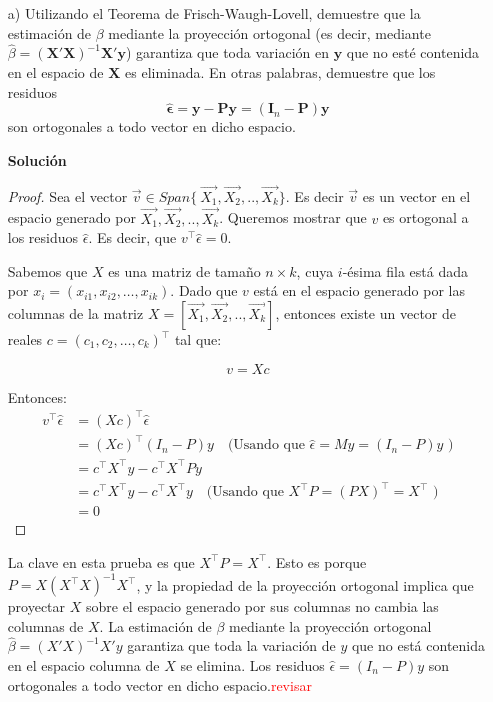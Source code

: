 \documentclass[a4paper, answers, addpoints, 11pt]{exam}
\newenvironment{solucion}{%
  \begin{mdframed}[
    backgroundcolor=blue!5,    %
    linecolor=blue!50,          %
    linewidth=2pt,              %
    leftmargin=10pt,            %
    rightmargin=10pt,           %
    topline=true,              %
    bottomline=true,            %
    roundcorner=10pt,           %
    innerleftmargin=10pt,       %
    innerrightmargin=10pt,      %
    innerbottommargin=10pt,     %
    innertopmargin=10pt         %
  ]%
  \begin{tcolorbox}[colframe=blue!50!black, colback=blue!50, coltitle=white, sharp corners=all, boxrule=1mm, width=\textwidth, halign=left, valign=center, top=0mm, bottom=0mm, left=0mm, right=0mm] \textbf{Solución} \end{tcolorbox} }{\end{mdframed}}
\begin{document}
\begin{enumerate}
\begin{itemize}
    \item[a)] Utilizando el Teorema de Frisch-Waugh-Lovell, demuestre que la estimación de \(\beta\) mediante la proyección ortogonal (es decir, mediante \(\hat{\beta} = (\mathbf{X}'\mathbf{X})^{-1}\mathbf{X}'\mathbf{y}\)) garantiza que toda variación en \(\mathbf{y}\) que no esté contenida en el espacio de \(\mathbf{X}\) es eliminada. En otras palabras, demuestre que los residuos
\[
\hat{\boldsymbol\epsilon} = \mathbf{y} - \mathbf{P}\mathbf{y} = (\mathbf{I}_n - \mathbf{P})\mathbf{y}
\]
son ortogonales a todo vector en dicho espacio.

 \begin{solucion}
  \begin{proof}
     Sea el vector \(\vec{v}  \in Span \{\ \vec{X_1}, \vec{X_2},.., \vec{X_k} \}\). Es decir $\vec{v}$ es un vector en el espacio generado por \( \vec{X_1}, \vec{X_2},.., \vec{X_k} \). Queremos mostrar que \( v \) es ortogonal a los residuos \( \hat{\epsilon} \). Es decir, que \( v^\top \hat{\epsilon} = 0 \).

Sabemos que \( X \) es una matriz de tamaño \( n \times k \), cuya \( i \)-ésima fila está dada por \( x_i = (x_{i1}, x_{i2}, \dots, x_{ik}) \).
Dado que \( v \) está en el espacio generado por las columnas de la matriz \( X = [\vec{X_1}, \vec{X_2},.., \vec{X_k}] \), entonces existe un vector de reales \( c = (c_1, c_2, \dots, c_k)^\top \) tal que:

\[
v = X c
\]

Entonces:
\begin{align*}
    v^\top \hat{\epsilon} & = (X c)^\top \hat{\epsilon}\\
    & = (Xc)^\top (I_n - P) y \quad \text{(Usando que $\hat{\epsilon}=My=(I_n - P)y$ )} \\
     & = c^\top X^\top y - c^\top X^\top P y \\
                       &= c^\top X^\top y - c^\top X^\top y \quad \text{(Usando que $X^\top P=(P X)^\top=X^\top$ )}\\
                       &= 0
\end{align*}

\end{proof}
La clave en esta prueba es que $X^\top P=X^\top$. Esto es porque  \( P = X (X^\top X)^{-1} X^\top \), y la propiedad de la proyección ortogonal implica que proyectar \( X \) sobre el espacio generado por sus columnas no cambia las columnas de \( X \).  La estimación de \( \beta \) mediante la proyección ortogonal \( \hat{\beta} = (X'X)^{-1} X'y \) garantiza que toda la variación de \( y \) que no está contenida en el espacio columna de \( X \) se elimina. Los residuos \( \hat{\epsilon} = (I_n - P)y \) son ortogonales a todo vector en dicho espacio.\textcolor{red}{revisar}


\end{solucion}
\end{itemize}
\end{enumerate}
\end{document}
